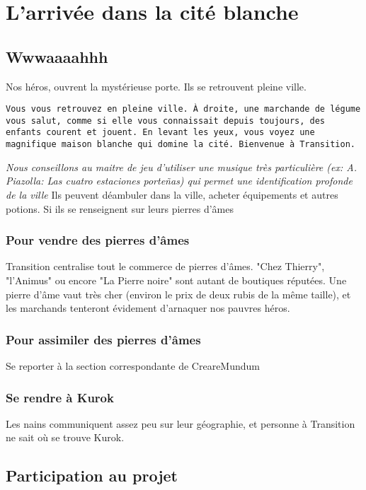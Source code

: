 \documentclass[a4paper, 11pt]{article}
\begin{document}
\chapter{L'arrivée dans la cité blanche}
\section{Wwwaaaahhh}
Nos héros, ouvrent la mystérieuse porte. Ils se retrouvent pleine ville. 
\begin{flushright}
\texttt{Vous vous retrouvez en pleine ville. À droite, une marchande de légume vous salut, comme si elle vous connaissait depuis toujours, des enfants courent et jouent.
\newline
En levant les yeux, vous voyez une magnifique maison blanche qui domine la cité.
\newline
Bienvenue à Transition.}
\end{flushright}
\emph{Nous conseillons au maitre de jeu d'utiliser une musique très particulière (ex: A. Piazolla: Las cuatro estaciones porteñas) qui permet une identification profonde de la ville}
Ils peuvent déambuler dans la ville, acheter équipements et autres potions. Si ils se renseignent sur leurs pierres d'âmes
\subsection{Pour vendre des pierres d'âmes}
Transition centralise tout le commerce de pierres d'âmes. "Chez Thierry", "l'Animus" ou encore "La Pierre noire" sont autant de boutiques réputées. Une pierre d'âme vaut très cher (environ le prix de deux rubis de la même taille), et les marchands tenteront évidement d'arnaquer nos pauvres héros.
\subsection{Pour assimiler des pierres d'âmes}
Se reporter à la section correspondante de CreareMundum
\subsection{Se rendre à Kurok}
Les nains communiquent assez peu sur leur géographie, et personne à Transition ne sait où se trouve Kurok.


\newpage
\section{Participation au projet}
\end{document}
